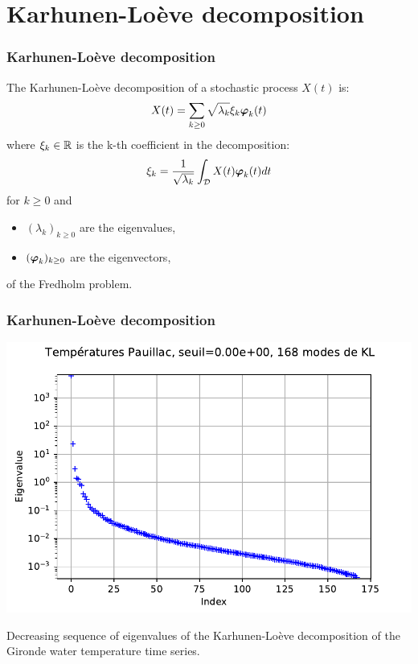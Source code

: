 \documentclass[10pt]{beamer}
\begin{document}

\section{Karhunen-Loève decomposition}

\begin{frame}
\frametitle{Karhunen-Loève decomposition}
The Karhunen-Loève decomposition of a stochastic process $X(t)$ is:
$$
X(t) = \sum_{k\geq 0} \sqrt{\lambda_k} \xi_k {\boldsymbol \varphi}_k(t)
$$
where $\xi_k \in\mathbb{R}$ is the k-th coefficient in the decomposition:
$$
\xi_k = \frac{1}{\sqrt{\lambda_k}} \int_{\mathcal{D}} X(t) {\boldsymbol \varphi}_k(t) dt
$$
for $k\geq 0$ and
\begin{itemize}
\item $(\lambda_k)_{k\geq 0}$ are the eigenvalues, 
\item $({\boldsymbol \varphi}_k)_{k\geq 0}$ are the eigenvectors,
\end{itemize}
of the Fredholm problem. 
\end{frame}


\begin{frame}
\frametitle{Karhunen-Loève decomposition}

\begin{center}
\includegraphics[height=0.7\textheight]{figures/decompositionKL-1H-log.pdf}
\end{center}

Decreasing sequence of eigenvalues of the Karhunen-Loève decomposition 
of the Gironde water temperature time series. 

\end{frame}
\end{document}
